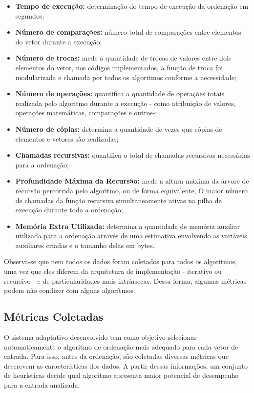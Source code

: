 \documentclass{article}
\begin{document}
\begin{itemize}
    \item \textbf{Tempo de execução:} determinação do tempo de execução da ordenação em segundos;
    \item \textbf{Número de comparações:} número total de comparações entre elementos do vetor durante a execução;
    \item \textbf{Número de trocas:} mede a quantidade de trocas de valores entre dois elementos do vetor, nos códigos implementados, a função de troca foi modularizada e chamada por todos os algoritmos conforme a necessidade;
    \item \textbf{Número de operações:} quantifica a quantidade de operações totais realizada pelo algoritmo durante a execução - como atribuição de valores, operações matemáticas, comparações e outros-;
    \item \textbf{Número de cópias:} determina a quantidade de vezes que cópias de elementos e vetores são realizadas;
    \item \textbf{Chamadas recursivas:} quantifica o total de chamadas recursivas necessárias para a ordenação;
    \item \textbf{Profundidade Máxima da Recursão:} mede a altura máxima da árvore de recursão percorrida pelo algoritmo, ou de forma equivalente, O maior número de chamadas da função recursiva simultaneamente ativas na pilha de execução durante toda a ordenação;
    \item \textbf{Memória Extra Utilizada:} determina a quantidade de memória auxiliar utilizada para a ordenação através de uma estimativa envolvendo as variáveis auxiliares criadas e o tamanho delas em bytes.
\end{itemize}

Observa-se que nem todos os dados foram coletados para todos os algoritmos, uma vez que eles diferem da arquitetura de implementação - iterativo ou recursivo - e de particularidades mais intrínsecas. 
Dessa forma, algumas métricas podem não condizer com alguns algorítmos. 

\subsection{Métricas Coletadas}

O sistema adaptativo desenvolvido tem como objetivo selecionar automaticamente o algoritmo de ordenação mais adequado para cada vetor de entrada. Para isso, antes da ordenação, são coletadas diversas métricas que descrevem as características dos dados. A partir dessas informações, um conjunto de heurísticas decide qual algoritmo apresenta maior potencial de desempenho para a entrada analisada.
\end{document}
